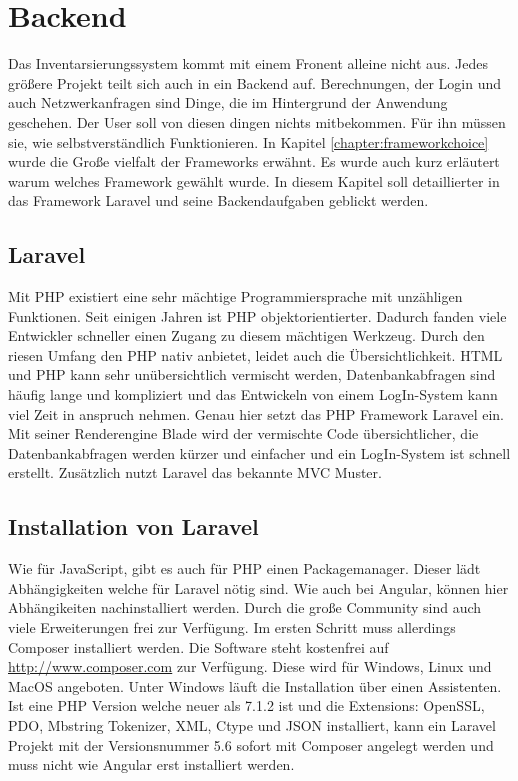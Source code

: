 \section{Backend}
Das Inventarsierungssystem kommt mit einem Fronent alleine nicht aus. Jedes größere Projekt teilt sich auch in ein Backend auf. Berechnungen, der Login und auch Netzwerkanfragen sind Dinge, die im Hintergrund der Anwendung geschehen. Der User soll von diesen dingen nichts mitbekommen. Für ihn müssen sie, wie selbstverständlich Funktionieren. In Kapitel \ref{chapter:frameworkchoice} wurde die Große vielfalt der Frameworks erwähnt. Es wurde auch kurz erläutert warum welches Framework gewählt wurde. In diesem Kapitel soll detaillierter in das Framework Laravel und seine Backendaufgaben geblickt werden.

\subsection{Laravel}
Mit \ac{PHP} existiert eine sehr mächtige Programmiersprache mit unzähligen Funktionen. Seit einigen Jahren ist \ac{PHP} objektorientierter. Dadurch fanden viele Entwickler schneller einen Zugang zu diesem mächtigen Werkzeug. Durch den riesen Umfang den \ac{PHP} nativ anbietet, leidet auch die Übersichtlichkeit. \ac{HTML} und \ac{PHP} kann sehr unübersichtlich vermischt werden, Datenbankabfragen sind häufig lange und kompliziert und das Entwickeln von einem LogIn-System kann viel Zeit in anspruch nehmen. Genau hier setzt das \ac{PHP} Framework Laravel ein. Mit seiner Renderengine Blade wird der vermischte Code übersichtlicher, die Datenbankabfragen werden kürzer und einfacher und ein LogIn-System ist schnell erstellt. Zusätzlich nutzt Laravel das bekannte \ac{MVC} Muster.\autocite{Laravel.2018}

\subsection{Installation von Laravel}
Wie für JavaScript, gibt es auch für \ac{PHP} einen Packagemanager. Dieser lädt Abhängigkeiten welche für Laravel nötig sind. Wie auch bei Angular, können hier Abhängikeiten nachinstalliert werden. Durch die große Community sind auch viele Erweiterungen frei zur Verfügung. Im ersten Schritt muss allerdings Composer installiert werden. Die Software steht kostenfrei auf \url{http://www.composer.com} zur Verfügung. Diese wird für Windows, Linux und MacOS angeboten. \autocite{Composer.2018} Unter Windows läuft die Installation über einen Assistenten. Ist eine \ac{PHP} Version welche neuer als 7.1.2 ist und die Extensions: OpenSSL, \ac{PDO}, Mbstring Tokenizer, \ac{XML}, Ctype und \ac{JSON} installiert, kann ein Laravel Projekt mit der Versionsnummer 5.6 sofort mit Composer angelegt werden und muss nicht wie Angular erst installiert werden.


